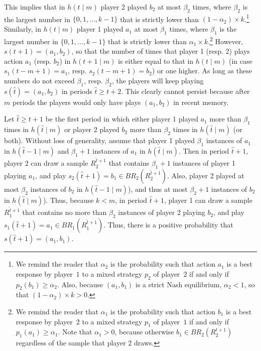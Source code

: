 This implies that in $h(t\mid m)$ player 2 played $b_2$ at most $\beta_2$ times, where $\beta_2$ is the largest number in $\{ 0,1,\ldots, k-1\}$ that is strictly lower than $(1-\alpha_2)\times k$.\footnote{We remind the reader that $\alpha_2$ is the probability such that action $a_1$ is a best response by player~$1$ to a mixed strategy $p_2$ of player~$2$ if and only if 
$p_2(b_1) \geq \alpha_2$. Also, because $(a_1,b_1)$ is a strict Nash equilibrium, $\alpha_2 < 1$, so that $(1-\alpha_2)\times k > 0$.}
Similarly, in $h(t\mid m)$ player 1 played $a_1$ at most $\beta_1$ times, where $\beta_1$ is the largest number in $\{ 0, 1,\ldots, k-1\}$ that is strictly lower than $\alpha_1\times k$.\footnote{We remind the reader that $\alpha_1$ is the probability such that action $b_1$ is a best response by player~$2$ to a mixed strategy $p_1$ of player~$1$ if and only if 
$p_1(a_1) \geq \alpha_1$. Note that $\alpha_1 > 0$, because otherwise $b_1\in BR_2(R_2^{t+1})$ regardless of the sample that player 2 draws.} 
However, $s(t+1)=(a_1,b_2)$, so that the number of times that player 1 (resp. 2) plays action $a_1$ (resp. $b_2$) in $h(t+1\mid m)$ is either equal to that in $h(t\mid m)$ (in case $s_1(t-m+1)=a_1$, resp. $s_2(t-m+1)=b_2$) or one higher. 
As long as these numbers do not exceed $\beta_1$, resp. $\beta_2$, the players will keep playing $s(\hat{t})=(a_1,b_2)$ in periods $\hat{t} \geq t+2$. This clearly cannot persist because after $m$ periods the players would only have plays $(a_1,b_2)$ in recent memory. 
%

Let $\hat{t}\geq t+1$ be the first period in which either player 1 played $a_1$ more than $\beta_1$ times in $h(\hat{t}\mid m)$ or player 2 played $b_2$ more than $\beta_2$ times in $h(\hat{t}\mid m)$ (or both). %
Without loss of generality, assume that player 1 played $\beta_1$ instances of $a_1$ in $h(\hat{t}-1\mid m)$ and $\beta_1+1$ instances of $a_1$ in $h(\hat{t}\mid m)$. 
%
Then in period $\hat{t}+1$, player 2 can draw a sample $R_2^{\hat{t}+1}$ that contains $\beta_1+1$ instances of player 1 playing $a_1$, and play $s_2(\hat{t}+1)=b_1\in BR_2(R_2^{\hat{t}+1})$. 
%
Also, player 2 played at most $\beta_2$ instances of $b_2$ in $h(\hat{t}-1\mid m)$), and thus at most $\beta_2+1$ instances of $b_2$ in $h(\hat{t}\mid m)$). Thus, because $k<m$, in period $\hat{t}+1$, player 1 can draw a sample $R_1^{\hat{t}+1}$ that contains no more than $\beta_2$ instances of player 2 playing $b_2$, and play $s_1(\hat{t}+1)=a_1\in BR_1(R_1^{\hat{t}+1})$. 
%
Thus, there is a positive probability that $s(\hat{t}+1)=(a_1,b_1)$. 

